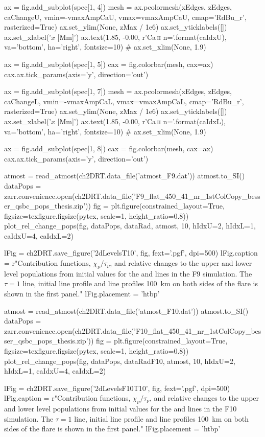 \begin{pycode}[2DRT]
    ax = fig.add_subplot(spec[1, 4])
    mesh = ax.pcolormesh(xEdges, zEdges, caChangeU, vmin=-vmaxAmpCaU, vmax=vmaxAmpCaU,
                         cmap='RdBu_r', rasterized=True)
    ax.set_ylim(None, zMax / 1e6)
    ax.set_yticklabels([])
    ax.set_xlabel('$x$ [Mm]')
    ax.text(1.85, -0.00, r'Ca\,\textsc{{ii}} n={}'.format(caIdxU), va='bottom', ha='right', fontsize=10)
    # ax.set_xlim(None, 1.9)

    ax = fig.add_subplot(spec[1, 5])
    cax = fig.colorbar(mesh, cax=ax)
    cax.ax.tick_params(axis='y', direction='out')

    ax = fig.add_subplot(spec[1, 7])
    mesh = ax.pcolormesh(xEdges, zEdges, caChangeL, vmin=-vmaxAmpCaL, vmax=vmaxAmpCaL,
                         cmap='RdBu_r', rasterized=True)
    ax.set_ylim(None, zMax / 1e6)
    ax.set_yticklabels([])
    ax.set_xlabel('$x$ [Mm]')
    ax.text(1.85, -0.00, r'Ca\,\textsc{{ii}} n={}'.format(caIdxL), va='bottom', ha='right', fontsize=10)
    # ax.set_xlim(None, 1.9)

    ax = fig.add_subplot(spec[1, 8])
    cax = fig.colorbar(mesh, cax=ax)
    cax.ax.tick_params(axis='y', direction='out')


atmost = read_atmost(ch2DRT.data_file('atmost_F9.dat'))
atmost.to_SI()
dataPops = zarr.convenience.open(ch2DRT.data_file('F9_flat_450_41_nr_1stColCopy_besser_qsbc_pops_thesis.zip'))
fig = plt.figure(constrained_layout=True, figsize=texfigure.figsize(pytex, scale=1, height_ratio=0.8))
plot_rel_change_pops(fig, dataPops, dataRad, atmost, 10, hIdxU=2, hIdxL=1, caIdxU=4, caIdxL=2)

lFig = ch2DRT.save_figure('2dLevelsT10', fig, fext='.pgf', dpi=500)
lFig.caption = r"Contribution functions, $\chi_\nu/\tau_\nu$, and relative changes to the upper and lower level populations from initial values for the \Ha{} and \CaLine{} lines in the F9 simulation. The $\tau=1$ line, initial line profile and line profiles \SI{100}{\kilo\metre} on both sides of the flare is shown in the first panel."
lFig.placement = 'htbp'

atmost = read_atmost(ch2DRT.data_file('atmost_F10.dat'))
atmost.to_SI()
dataPops = zarr.convenience.open(ch2DRT.data_file('F10_flat_450_41_nr_1stColCopy_besser_qsbc_pops_thesis.zip'))
fig = plt.figure(constrained_layout=True, figsize=texfigure.figsize(pytex, scale=1, height_ratio=0.8))
plot_rel_change_pops(fig, dataPops, dataRadF10, atmost, 10, hIdxU=2, hIdxL=1, caIdxU=4, caIdxL=2)

lFig = ch2DRT.save_figure('2dLevelsF10T10', fig, fext='.pgf', dpi=500)
lFig.caption = r"Contribution functions, $\chi_\nu/\tau_\nu$, and relative changes to the upper and lower level populations from initial values for the \Ha{} and \CaLine{} lines in the F10 simulation. The $\tau=1$ line, initial line profile and line profiles \SI{100}{\kilo\metre} on both sides of the flare is shown in the first panel."
lFig.placement = 'htbp'

\end{pycode}

